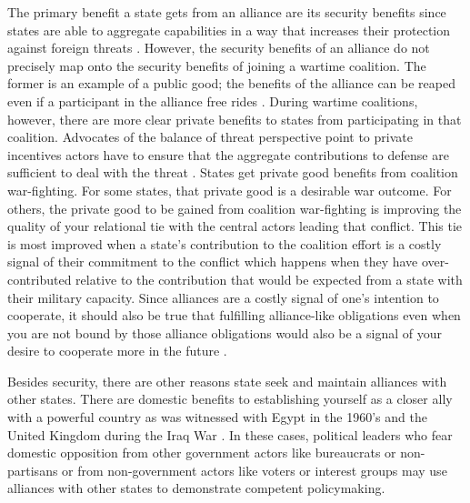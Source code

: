 \documentclass[12pt,letterpaper]{article}
\begin{document}
		The primary benefit a state gets from an alliance are its security benefits since states are able to aggregate capabilities in a way that increases their protection against foreign threats \citep{waltz_theoryinternationalpolitics_1979}. However, the security benefits of an alliance do not precisely map onto the security benefits of joining a wartime coalition. The former is an example of a public good; the benefits of the alliance can be reaped even if a participant in the alliance free rides \citep{olson_economictheoryalliances_1966}. During wartime coalitions, however, there are more clear private benefits to states from participating in that coalition. Advocates of the balance of threat perspective point to private incentives actors have to ensure that the aggregate contributions to defense are sufficient to deal with the threat \citep{bennett_friendsneedburden_1997, baltrusaitis_coalitionpoliticsiraq_2010, davidson_neoclassicalrealistexplanation_2011}. 		States get private good benefits from coalition war-fighting. For some states, that private good is a desirable war outcome.  For others, the private good to be gained from coalition war-fighting is improving the quality of your relational tie with the central actors leading that conflict. This tie is most improved when a state's contribution to the coalition effort is a costly signal of their commitment to the conflict which happens when they have over-contributed relative to the contribution that would be expected from a state with their military capacity. Since alliances are a costly signal of one's intention to cooperate, it should also be true that fulfilling alliance-like obligations even when you are not bound by those alliance obligations would also be a signal of your desire to cooperate more in the future \citep{warren_geometrysecuritymodeling_2010a}.

		Besides security, there are other reasons state seek and maintain alliances with other states. There are domestic benefits to establishing yourself as a closer ally with a powerful country as was witnessed with Egypt in the 1960's \citep{barnett_domesticsourcesalliances_1991} and the United Kingdom during the Iraq War \citep{davidson_americaallieswar_2011}. In these cases, political leaders who fear domestic opposition from other government actors like bureaucrats or non-partisans or from non-government actors like voters or interest groups may use alliances with other states to demonstrate competent policymaking.
\end{document}
